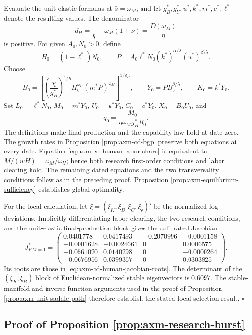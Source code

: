 Evaluate the unit-elastic formulas at \(\bar s=\omega_M\), and let
\(g_B^*,g_Y^*,u^*,k^*,m^*,c^*,\ell^*\) denote the resulting values. The
denominator
\[
 d_H=\frac1\eta-\omega_M(1+\nu)=\frac{D(\omega_M)}{\eta}
\]
is positive. For given \(A_0,N_0>0\), define
\[
 H_0=(1-\ell^*)N_0,\qquad
 P=A_0\ell^*N_0(k^*)^{\alpha/\lambda}
 (u^*)^{\beta/\lambda}.
\]
Choose
\[
 B_0=\left[
 \left(\frac{\chi}{g_B^*}\right)^{1/\eta}
 H_0^{\omega_H}(m^*P)^{\omega_M}
 \right]^{1/d_H},\qquad
 Y_0=PB_0^{\beta/\lambda},\qquad K_0=k^*Y_0.
\]
Set \(L_0=\ell^*N_0\), \(M_0=m^*Y_0\), \(U_0=u^*Y_0\),
\(C_0=c^*Y_0\), \(X_0=B_0U_0\), and
\[
 q_0=\frac{M_0}{\eta\omega_M g_B^*B_0}.
\]
The definitions make final production and the capability law hold at date zero.
The growth rates in Proposition \ref{prop:axm-cd-bgp} preserve both equations
at every date. Equation \eqref{eq:axm-cd-human-labor-share} is equivalent to
\(M/(wH)=\omega_M/\omega_H\); hence both research first-order conditions and
labor clearing hold. The remaining dated equations and the two transversality
conditions follow as in the preceding proof. Proposition
\ref{prop:axm-equilibrium-sufficiency} establishes global optimality.

For the local calculation, let
\(\xi=(\xi_K,\xi_B,\xi_C,\xi_q)'\) be the normalized log deviations. Implicitly
differentiating labor clearing, the two research conditions, and the
unit-elastic final-production block gives the calibrated Jacobian
\[
 J_{HM=1}^*=\begin{pmatrix}
  0.0401778& 0.0417493&-0.2070996&-0.0001158\\
 -0.0001628&-0.0024661&0&0.0006575\\
 -0.0561020&0.0140298&0&-0.0000264\\
 -0.0676956&0.0399367&0&0.0303825
 \end{pmatrix}.
\]
Its roots are those in \eqref{eq:axm-cd-human-jacobian-roots}. The determinant
of the \((\xi_K,\xi_B)\) block of Euclidean-normalized stable eigenvectors is
\(0.6097\). The stable-manifold and inverse-function arguments used in the proof
of Proposition \ref{prop:axm-unit-saddle-path} therefore establish the stated
local selection result. \(\square\)

\subsection{Proof of Proposition \ref{prop:axm-research-burst}}

